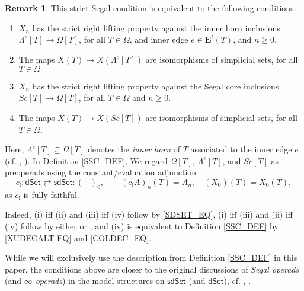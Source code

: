 \documentclass[a4paper,10pt
,draft
]{article}%
\numberwithin{equation}{section}
\numberwithin{figure}{section}
\theoremstyle{definition} %
\newtheorem{remark}[equation]{Remark}%
\newcommand{\dSet}{\mathsf{dSet}}
\newcommand{\sdSet}{\mathsf{sdSet}}
\newcommand{\1}{\ensuremath{\mathbbm 1}}%
\begin{document}
\begin{remark}
        \label{SSC_REM}
        This strict Segal condition is equivalent to the following conditions:
        \begin{enumerate}
        \item $X_n$ has the strict right lifting property against
                the inner horn inclusions $\Lambda^e[T] \to \Omega[T]$,
                for all $T \in \Omega$, and inner edge $e \in \boldsymbol{E}^i(T)$, and $n \geq 0$.
        \item The maps $X(T) \to X(\Lambda^e[T])$
                are isomorphisms of simplicial sets,
                for all $T \in \Omega$
        \item $X_n$ has the strict right lifting property against
                the Segal core inclusions $Sc[T] \to \Omega[T]$,
                for all $T \in \Omega$ and $n \geq 0$.
        \item The maps
                $X(T) \to X(Sc[T])$
                are isomorphisms of simplicial sets,
                for all $T \in \Omega$.
        \end{enumerate}
        Here,
        $\Lambda^e[T] \subseteq \Omega[T]$ denotes the \textit{inner horn} of $T$ associated to the inner edge $e$
        (cf. \cite[\S 2]{CM13a}, \cite[\S 2.3]{BP_edss}).
        In Definition \ref{SSC_DEF},
        We regard $\Omega[T]$, $\Lambda^e[T]$, and $Sc[T]$
        as preoperads using the constant/evaluation adjunction 
        \[
                c_! \colon \dSet \rightleftarrows \sdSet \colon (-)_0,
                \qquad
                (c_!A)_n(T) = A_n,
                \quad
                (X_0)(T) = X_0(T),
        \]
        as $c_!$ is fully-faithful.
        
        Indeed,
        (i) iff (ii) and (iii) iff (iv) follow by \eqref{SDSET_EQ},
        (i) iff (iii) and (ii) iff (iv) follow by either \cite[Prop. 2.5 and Cor. 2.6]{CM13a} or \cite[Props. 3.22, 3.31]{BP_edss}, and
        (iv) is equivalent to Definition \ref{SSC_DEF} by \eqref{XUDECALT EQ} and \eqref{COLDEC_EQ}.

        While we will exclusively use the description from Definition \ref{SSC_DEF} in this paper,
        the conditions above are closer to the original discussions of
        \textit{Segal operads} (and \textit{$\infty$-operads})
        in the model structures on $\sdSet$ (and $\dSet$),
        cf. \cite[Cor. 5.6]{CM13a}, \cite[Prop. 5.3]{BP_edss}.
\end{remark}
\end{document}
